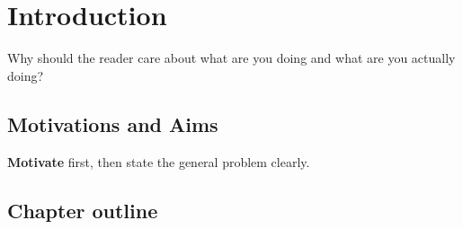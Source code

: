 \documentclass{l4proj}
\begin{document}
%
%
%
%
%
%
%
%
\chapter{Introduction}



Why should the reader care about what are you doing and what are you actually doing?
\section{Motivations and Aims}

\textbf{Motivate} first, then state the general problem clearly. 

\section{Chapter outline}

\end{document}
